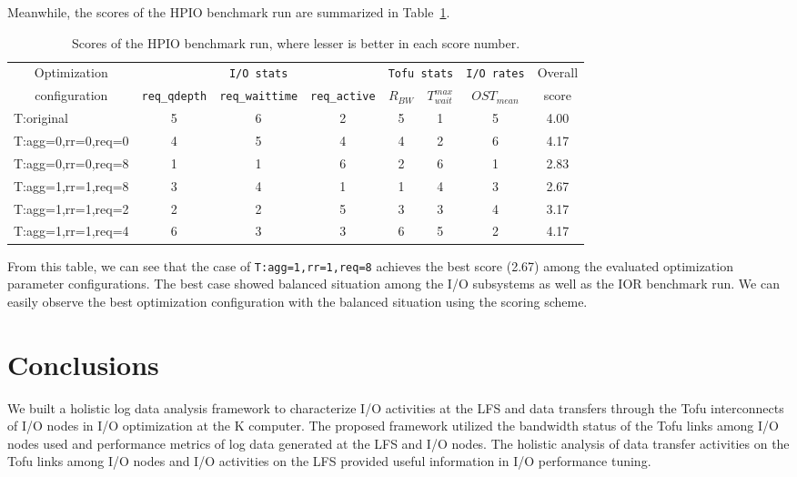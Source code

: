 \documentclass{jhps}
\begin{document}
Meanwhile, the scores of the HPIO benchmark run are summarized in
Table~\ref{tbl:HPIO_OVERALL_EVAL}.
%
\begin{table}[tb]
\caption{Scores of the HPIO benchmark run, where lesser is better in each score number.}
\centering
\begin{tabular}{lccccccc}
\hline
\multicolumn{1}{c}{Optimization}  & \multicolumn{3}{c}{{\tt I/O stats}} & \multicolumn{2}{c}{{\tt Tofu stats}} & {\tt I/O rates} & Overall \\
\multicolumn{1}{c}{configuration} & {\tt req\_qdepth} & {\tt req\_waittime} & {\tt req\_active} &  $R_{BW}$ & $T_{wait}^{max}$ & $OST_{mean}$ & score \\
\hline
T:original     	& 5 & 6 & 2 & 5 & 1 & 5 & 4.00 \\
T:agg=0,rr=0,req=0 & 4 & 5 & 4 & 4 & 2 & 6 & 4.17 \\
T:agg=0,rr=0,req=8 & 1 & 1 & 6 & 2 & 6 & 1 & 2.83 \\
T:agg=1,rr=1,req=8 & 3 & 4 & 1 & 1 & 4 & 3 & 2.67 \\
T:agg=1,rr=1,req=2 & 2 & 2 & 5 & 3 & 3 & 4 & 3.17 \\
T:agg=1,rr=1,req=4 & 6 & 3 & 3 & 6 & 5 & 2 & 4.17 \\
\hline
\end{tabular}
\label{tbl:HPIO_OVERALL_EVAL}
\end{table}
%
From this table, we can see that the case of {\tt T:agg=1,rr=1,req=8}
achieves the best score (2.67) among the evaluated optimization parameter configurations.
The best case showed balanced situation among the I/O subsystems
as well as the IOR benchmark run.
We can easily observe the best optimization configuration with
the balanced situation using the scoring scheme.

\section{Conclusions}
\label{sec:CONCLUSIONS}

We built a holistic log data analysis framework to characterize I/O activities
at the LFS and data transfers through the Tofu interconnects of I/O nodes
in I/O optimization at the K computer.
The proposed framework utilized the bandwidth status of the Tofu links
among I/O nodes used and performance metrics of log data generated at the LFS
and I/O nodes.
The holistic analysis of data transfer activities on the Tofu links among I/O nodes
and I/O activities on the LFS provided useful information in I/O performance tuning.
\end{document}
